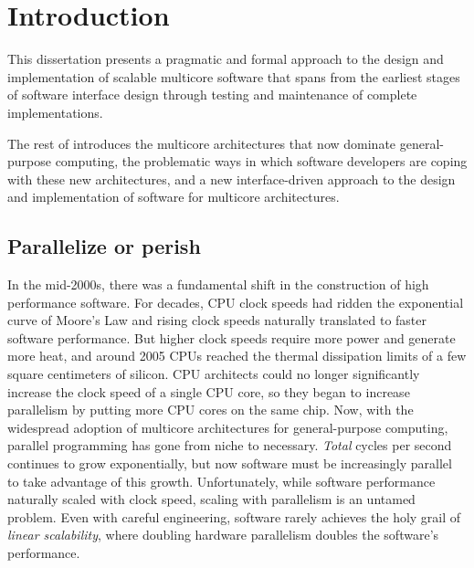 \section{Introduction}
\label{sec:intro}


This dissertation presents a pragmatic and formal approach to the
design and implementation of scalable multicore software that spans
from the earliest stages of software interface design through
testing and maintenance of complete implementations.

The rest of  introduces the multicore
architectures that now dominate general-purpose computing, the
problematic ways in which software developers are coping with these
new architectures, and a new interface-driven approach to the design and
implementation of software for multicore architectures.


\subsection{Parallelize or perish}

In the mid-2000s, there was a fundamental shift in the construction of
high performance software.  For decades, CPU clock speeds had ridden
the exponential curve of Moore's Law and rising clock speeds naturally
translated to faster software performance.
%
But higher clock speeds require more power and generate more heat, and
around 2005 CPUs reached the thermal dissipation
limits of a few square centimeters of silicon.
%
CPU architects could no longer significantly increase the clock speed
of a single CPU core, so
they began to increase parallelism by putting more CPU cores on the same
chip.
%
Now, with the widespread adoption of multicore architectures for
general-purpose computing, parallel programming has gone from niche to
necessary.
%
\emph{Total} cycles per second continues to grow exponentially, but
now software must be increasingly parallel to take advantage of this
growth.
%
Unfortunately, while software performance naturally scaled with clock speed,
scaling with parallelism is an untamed problem.  Even with careful
engineering, software rarely achieves the holy grail of \emph{linear
  scalability}, where doubling hardware parallelism doubles the
software's performance.
%

